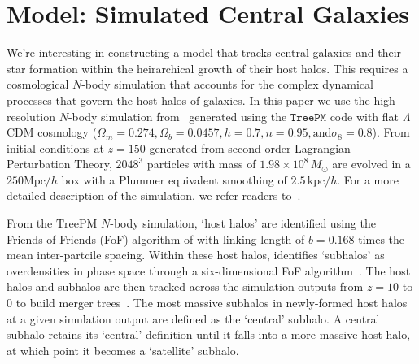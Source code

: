 \documentclass[12pt, letterpaper, preprint]{aastex}
\begin{document}
\section{Model: Simulated Central Galaxies} \label{sec:sim}
We're interesting in constructing a model that tracks central galaxies and 
their star formation within the heirarchical growth of their host halos. This 
requires a cosmological $N$-body simulation that accounts for the complex 
dynamical processes that govern the host halos of galaxies. In this paper 
we use the high resolution $N$-body simulation from~\cite{wetzel2013} generated 
using the \cite{white2002} $\mathtt{TreePM}$ code with flat $\Lambda$CDM cosmology 
($\Omega_m =0.274, \Omega_b = 0.0457, h = 0.7, n=0.95, \mathrm{and} \sigma_8 = 0.8$).
From initial conditions at $z = 150$ generated from second-order Lagrangian 
Perturbation Theory, $2048^3$ particles with mass of $1.98 \times 10^8\,M_\odot$ are 
evolved in a $250 \mathrm{Mpc}/h$ box with a Plummer equivalent smoothing of 
$2.5\,\mathrm{kpc}/h$. For a more detailed description of the simulation, we 
refer readers to~\cite{wetzel2013, wetzel2014}.

From the $\mathrm{TreePM}$ $N$-body simulation, `host halos' are identified 
using the Friends-of-Friends (FoF) algorithm of \cite{davis1985} with 
linking length of $b = 0.168$ times the mean inter-partcile spacing. Within 
these host halos, \cite{wetzel2013} identifies `subhalos' as overdensities 
in phase space through a six-dimensional FoF algorithm~\citep[FoF6D][]{white2010}. 
The host halos and subhalos are then tracked across the simulation outputs 
from $z = 10$ to $0$ to build merger trees~\citep{wetzel2009,wetzel2010}. 
The most massive subhalos in newly-formed host halos at a given simulation 
output are defined as the `central' subhalo. A central subhalo retains its 
`central' definition until it falls into a more massive host halo, at which 
point it becomes a `satellite' subhalo. 
\end{document}
